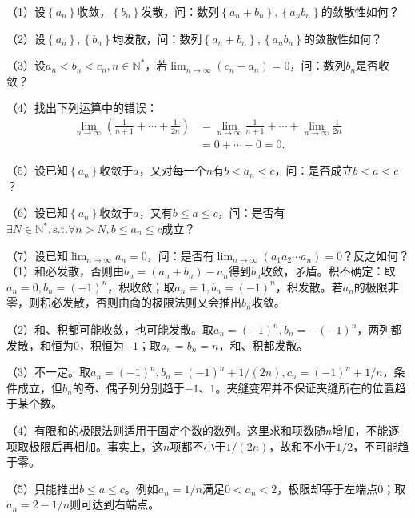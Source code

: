 （1）设\(\left\{ a_{n} \right\}\)收敛，\(\left\{ b_{n} \right\}\)发散，问：数列\(\left\{ a_{n} + b_{n} \right\} , \left\{ a_{n} b_{n} \right\}\)的敛散性如何？

（2）设\(\left\{ a_{n} \right\} , \left\{ b_{n} \right\}\)均发散，问：数列\(\left\{ a_{n} + b_{n} \right\} , \left\{ a_{n} b_{n} \right\}\)的敛散性如何？

（3）设\(a_{n} < b_{n} < c_{n} , n \in \mathbb{N}^{*}\)，若\(\lim_{n \to \infty} \left( c_{n} - a_{n} \right) = 0\)，问：数列\(b_{n}\)是否收敛？

（4）找出下列运算中的错误：
\begin{equation*}
\begin{aligned}
\lim_{n\to\infty}\left(\frac1{n+1}+\cdots+\frac1{2n}\right)
&=\lim_{n\to\infty}\frac1{n+1}+\cdots+\lim_{n\to\infty}\frac1{2n}\\
&=0+\cdots+0=0.
\end{aligned}
\end{equation*}

（5）设已知\(\left\{ a_{n} \right\}\)收敛于\(a\)，又对每一个\(n\)有\(b < a_{n} < c\)，问：是否成立\(b < a < c\)？

（6）设已知\(\left\{ a_{n} \right\}\)收敛于\(a\)，又有\(b \le a \le c\)，问：是否有\(\exists N \in \mathbb{N}^{*} , \text{s.t.} \forall n > N , b \le a_{n} \le c\)成立？

（7）设已知\(\lim_{n \to \infty} a_{n} = 0\)，问：是否有\(\lim_{n \to \infty} \left( a_{1} a_{2} \cdots a_{n} \right) = 0\)？反之如何？
\solutionanswer
（1）和必发散，否则由\(b_n=(a_n+b_n)-a_n\)得到\(b_n\)收敛，矛盾。积不确定：取\(a_n=0,b_n=(-1)^n\)，积收敛；取\(a_n=1,b_n=(-1)^n\)，积发散。若\(a_n\)的极限非零，则积必发散，否则由商的极限法则又会推出\(b_n\)收敛。

（2）和、积都可能收敛，也可能发散。取\(a_n=(-1)^n,b_n=-(-1)^n\)，两列都发散，和恒为\(0\)，积恒为\(-1\)；取\(a_n=b_n=n\)，和、积都发散。

（3）不一定。取\(a_n=(-1)^n,b_n=(-1)^n+1/(2n),c_n=(-1)^n+1/n\)，条件成立，但\(b_n\)的奇、偶子列分别趋于\(-1\)、\(1\)。夹缝变窄并不保证夹缝所在的位置趋于某个数。

（4）有限和的极限法则适用于固定个数的数列。这里求和项数随\(n\)增加，不能逐项取极限后再相加。事实上，这\(n\)项都不小于\(1/(2n)\)，故和不小于\(1/2\)，不可能趋于零。

（5）只能推出\(b\le a\le c\)。例如\(a_n=1/n\)满足\(0<a_n<2\)，极限却等于左端点\(0\)；取\(a_n=2-1/n\)则可达到右端点。

